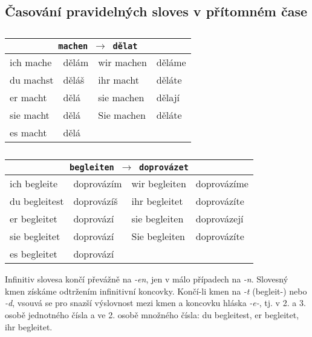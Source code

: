   \subsection*{Časování pravidelných sloves v přítomném čase}
    \begin{table}[ht!]   %
      \begin{tabular}{llll}
        \hline
        \multicolumn{4}{c}{\texttt{machen \(\rightarrow\) dělat}}     \\
        \hline
        ich mache & dělám & wir machen & děláme  \\
        du machst & děláš & ihr macht  & děláte  \\
        er macht  & dělá  & sie machen & dělají  \\
        sie macht & dělá  & Sie machen & děláte  \\
        es macht  & dělá  &            &         \\
        \hline
      \end{tabular}
      \caption*{ }
    \end{table}

    \begin{table}[ht!]   %
      \begin{tabular}{llll}
        \hline
        \multicolumn{4}{c}{\texttt{begleiten \(\rightarrow\) doprovázet}}     \\
        \hline   
        ich begleite    & doprovázím & wir begleiten  & doprovázíme \\
        du begleitest   & doprovázíš & ihr begleitet  & doprovázíte \\
        er begleitet    & doprovází  & sie begleiten  & doprovázejí \\
        sie begleitet   & doprovází  & Sie begleiten  & doprovázíte \\
        es begleitet    & doprovází  &                &             \\ 
        \hline
      \end{tabular}
      \caption*{ }
    \end{table}
    
    Infinitiv slovesa končí převážně na \emph{-en}, jen v málo případech na \emph{-n}. Slovesný 
    kmen získáme odtržením infinitivní koncovky. Končí-li kmen na \emph{-t} (begleit-) nebo 
    \emph{-d}, vsouvá se pro snazší výslovnost mezi kmen a koncovku hláska \emph{-e-}, tj. v 2. a 
    3. osobě jednotného čísla a ve 2. osobě množného čísla: du begleitest, er begleitet, ihr 
    begleitet.

